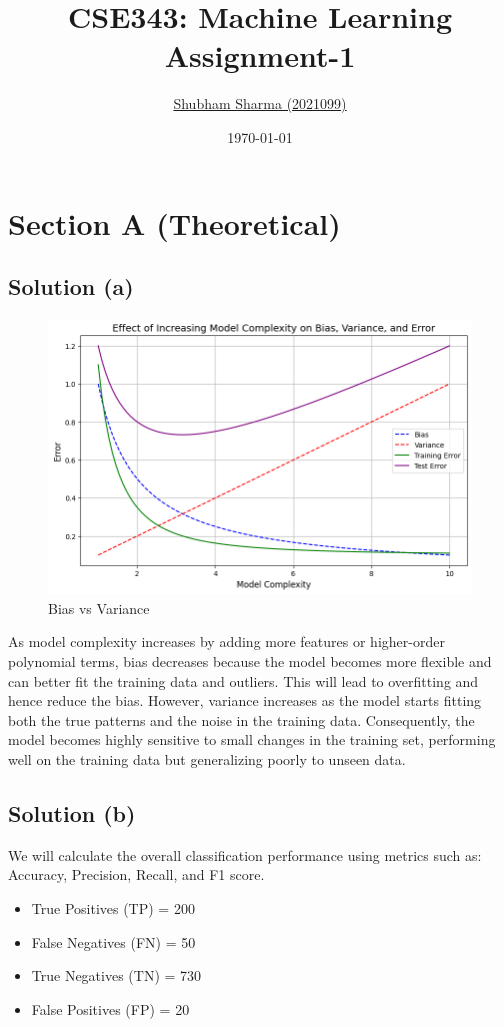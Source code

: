 \documentclass{article}
\title{
    \textbf{CSE343: Machine Learning} \\ \vspace*{-5pt}
    \textbf{\large{Assignment-1}}
}
\author{\href{mailto:shubham21099@iiitd.ac.in}{Shubham Sharma (2021099)}}
\date{\today}
\begin{document}
\maketitle


\section{Section A (Theoretical)}

\subsection*{Solution (a)}
\begin{figure}[h] %
    \centering
    \includegraphics[width=0.5\linewidth]{assets/Aa.png}
    \caption{Bias vs Variance}
    \label{fig:a}
\end{figure}
As model complexity increases by adding more features or higher-order polynomial terms, bias decreases because the model becomes more flexible and can better fit the training data and outliers. This will lead to overfitting and hence reduce the bias. However, variance increases as the model starts fitting both the true patterns and the noise in the training data. Consequently, the model becomes highly sensitive to small changes in the training set, performing well on the training data but generalizing poorly to unseen data.

\vspace{10pt}
\subsection*{Solution (b)}
We will calculate the overall classification performance using metrics such as: Accuracy, Precision, Recall, and F1 score.
\begin{itemize}
    \item True Positives (TP) = 200
    \item False Negatives (FN) = 50
    \item True Negatives (TN) = 730
    \item False Positives (FP) = 20
\end{itemize}
\end{document}
